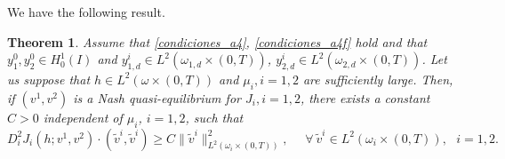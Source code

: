 \documentclass[11pt,a4paper]{amsart}
\numberwithin{equation}{section}
\newtheorem{theorem}{Theorem}[section]
\begin{document}
We have the following result.

\begin{theorem}\label{teoconvex}
	Assume that \eqref{condiciones_a4}, \eqref{condiciones_a4f} hold and that $y_1^0, y_2^0\in H^1_0(I)$ and $y^i_{1,d} \in L^2(\omega_{1,d} \times (0,T))$, $y^i_{2,d} \in L^2(\omega_{2,d} \times (0,T))$. Let us suppose that $h\in L^2(\omega \times (0,T))$ and $\mu_i, i=1,2$ are sufficiently large. Then, if $(v^1,v^2)$ is a Nash quasi-equilibrium for $J_i, i=1,2$, there exists a constant $C>0$ independent of $\mu_i$, $i=1,2$, such that
	\begin{equation}\label{ecsegundaderivada}
		D_i^2 J_i (h; v^1,v^2)\cdot (\widetilde{v}^i,\widetilde{v}^i)\geq C\|\widetilde{v}^i\|^2_{L^2(\omega_i\times (0,T))},\ \ \ \ \ \
		\forall  \ \widetilde{v}^i \in L^2(\omega_i\times (0,T)), \ \ \ i=1,2.
	\end{equation}
\end{theorem}
\end{document}
